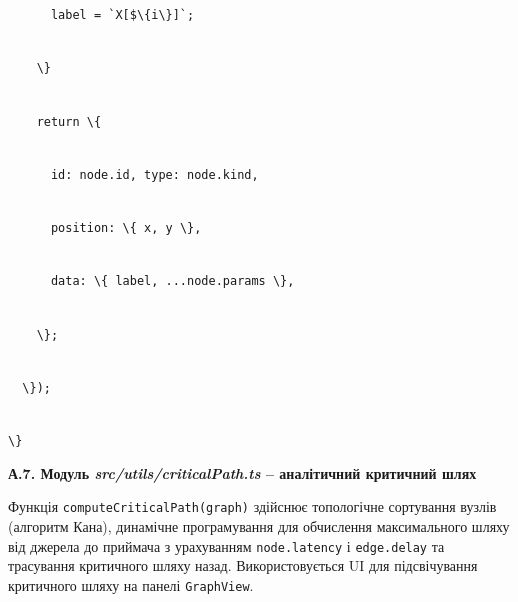 \documentclass[
]{article}
\newcommand{\passthrough}[1]{#1}
\begin{document}
\passthrough{\lstinline!      !}\passthrough{\lstinline!label!}\passthrough{\lstinline! !}\passthrough{\lstinline!=!}\passthrough{\lstinline! !}\passthrough{\lstinline!`X[$\{i\}]`;!}\strut \\
\passthrough{\lstinline!    !}\passthrough{\lstinline!\}!}\strut \\
\passthrough{\lstinline!    !}\passthrough{\lstinline!return!}\passthrough{\lstinline! !}\passthrough{\lstinline!\{!}\strut \\
\passthrough{\lstinline!      !}\passthrough{\lstinline!id:!}\passthrough{\lstinline! !}\passthrough{\lstinline!node.id,!}\passthrough{\lstinline! !}\passthrough{\lstinline!type:!}\passthrough{\lstinline! !}\passthrough{\lstinline!node.kind!}\passthrough{\lstinline!,!}\strut \\
\passthrough{\lstinline!      !}\passthrough{\lstinline!position:!}\passthrough{\lstinline! !}\passthrough{\lstinline!\{!}\passthrough{\lstinline! !}\passthrough{\lstinline!x,!}\passthrough{\lstinline! !}\passthrough{\lstinline!y!}\passthrough{\lstinline! !}\passthrough{\lstinline!\},!}\strut \\
\passthrough{\lstinline!      !}\passthrough{\lstinline!data:!}\passthrough{\lstinline! !}\passthrough{\lstinline!\{!}\passthrough{\lstinline! !}\passthrough{\lstinline!label,!}\passthrough{\lstinline! !}\passthrough{\lstinline!...!}\passthrough{\lstinline!node.params!}\passthrough{\lstinline! !}\passthrough{\lstinline!\},!}\strut \\
\passthrough{\lstinline!    !}\passthrough{\lstinline!\};!}\strut \\
\passthrough{\lstinline!  !}\passthrough{\lstinline!\});!}\strut \\
\passthrough{\lstinline!\}!}

\textbf{А.7. Модуль \emph{src/utils/criticalPath.ts} -- аналітичний
критичний шлях}

Функція
\passthrough{\lstinline!computeCriticalPath!}\passthrough{\lstinline!(!}\passthrough{\lstinline!graph!}\passthrough{\lstinline!)!}
здійснює топологічне сортування вузлів (алгоритм Кана), динамічне
програмування для обчислення максимального шляху від джерела до приймача
з урахуванням
\passthrough{\lstinline!node!}\passthrough{\lstinline!.!}\passthrough{\lstinline!latency!}
і
\passthrough{\lstinline!edge!}\passthrough{\lstinline!.!}\passthrough{\lstinline!delay!}
та трасування критичного шляху назад. Використовується UI для
підсвічування критичного шляху на панелі
\passthrough{\lstinline!GraphView!}.
\end{document}
